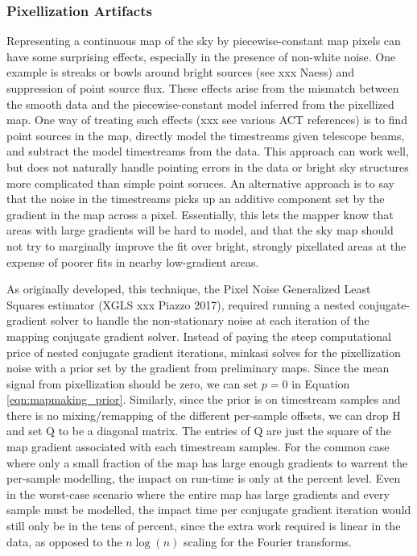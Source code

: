 \documentclass[12]{article}
\begin{document}
\subsubsection{Pixellization Artifacts}
Representing a continuous map of the sky by piecewise-constant map
pixels can have some surprising effects, especially in the presence of
non-white noise.  One example is streaks or bowls around bright
sources (see xxx Naess) and suppression of point source flux.  These
effects arise from the mismatch between the smooth data and the
piecewise-constant model inferred from the pixellized map.  One way of
treating such effects (xxx see various ACT references) is to find
point sources in the map, directly model the timestreams given
telescope beams, and subtract the model timestreams from the data.
This approach can work well, but does not naturally handle pointing
errors in the data or bright sky structures more complicated than
simple point soruces.  An alternative approach is to say that the
noise in the timestreams picks up an additive component set by the
gradient in the map across a pixel.  Essentially, this lets
the mapper know that areas with large gradients will be hard to model,
and that the sky map should not try to marginally improve the fit over
bright, strongly pixellated areas at the expense of poorer fits in
nearby low-gradient areas.  

As originally developed, this technique, the Pixel Noise Generalized
Least Squares estimator (XGLS xxx Piazzo 2017), required running a
nested conjugate-gradient solver to handle the non-stationary noise at
each iteration of the mapping conjugate gradient solver.  Instead of
paying the steep computational price of nested conjugate gradient
iterations, minkasi solves for the pixellization noise with a prior
set by the gradient from preliminary maps.  Since the mean signal from
pixellization should be zero, we can set $p=0$ in Equation
\ref{eqn:mapmaking_prior}.  Similarly, since the prior is on
timestream samples and there is no mixing/remapping of the different
per-sample offsets, we can drop $\mathrm{H}$ and set $\mathrm{Q}$ to
be a diagonal matrix.  The entries of $\mathrm{Q}$ are just the square
of the map gradient associated with each timestream samples.  For the
common case where only a small fraction of the map has large enough
gradients to warrent the per-sample modelling, the impact on run-time
is only at the percent level.  Even in the worst-case scenario where
the entire map has large gradients and every sample must be modelled,
the impact time per conjugate gradient iteration would still only be
in the tens of percent, since the extra work required is linear in the
data, as opposed to the $n\log(n)$ scaling for the Fourier
transforms.  
\end{document}
